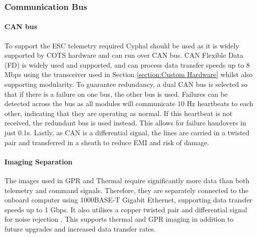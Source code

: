 \subsubsection{Communication Bus}\label{sub_sub_section:tgt_bus}
\paragraph{\gls{CAN} bus}
To support the \gls{ESC} telemetry required Cyphal should be used as it is widely supported by \gls{COTS} hardware and can run over \gls{CAN} bus. CAN Flexible Data (FD) is widely used and supported, and can process data transfer speeds up to 8 Mbps using the transceiver used in Section \ref{section:Custom Hardware} \cite{ti_tcan1472q1_datasheet} whilst also supporting modularity. To guarantee redundancy, a dual \gls{CAN} bus is selected so that if there is a failure on one bus, the other bus is used. Failures can be detected across the bus as all modules will communicate 10 Hz heartbeats to each other, indicating that they are operating as normal. If this heartbeat is not received, the redundant bus is used instead. This allows for failure handovers in just 0.1s. Lastly, as \gls{CAN} is a differential signal, the lines are carried in a twisted pair and transferred in a sheath to reduce \gls{EMI} and risk of damage. 
\paragraph{Imaging Separation}
The images used in GPR and Thermal require significantly more data than both telemetry and command signals. Therefore, they are separately connected to the onboard computer using 1000BASE-T Gigabit Ethernet, supporting data transfer speeds up to 1 Gbps. It also utilises a copper twisted pair and differential signal for noise rejection \cite{Ethernet}.  This supports thermal and GPR imaging in addition to future upgrades and increased data transfer rates.

